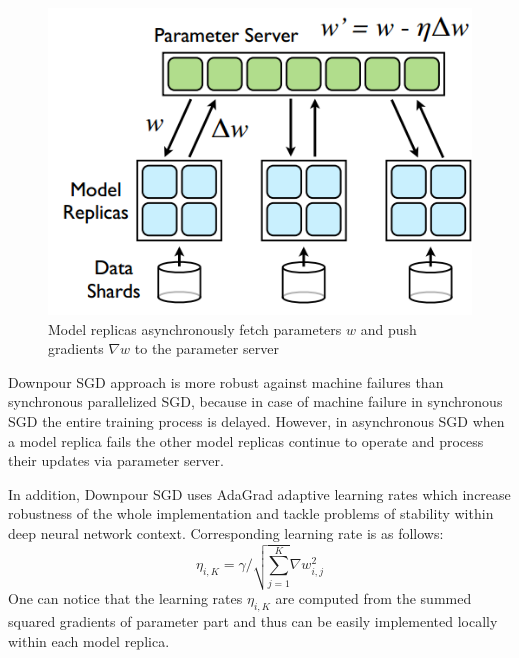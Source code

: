 \begin{figure}[h]
	\begin{center}
		\includegraphics[scale=0.4]{img/downpour-sgd-param.png}
		\caption{Model replicas asynchronously fetch parameters $w$ and push gradients $\nabla w$ to the parameter server}\label{5}
	\end{center}
\end{figure}

Downpour SGD approach is more robust against machine failures than synchronous parallelized SGD, because in case of machine failure in synchronous SGD the entire training process is delayed. However, in asynchronous SGD when a model replica fails the other model replicas continue to operate and process their updates via parameter server. 

In addition, Downpour SGD uses AdaGrad \cite{adagrad} adaptive learning rates which increase robustness of the whole implementation and tackle problems of stability within deep neural network context. Corresponding learning rate is as follows:
$$ \eta_{i,K}=\gamma / \sqrt{\sum\limits_{j=1}^{K}} \nabla w_{i,j}^2$$
One can notice that the learning rates $\eta_{i,K}$ are computed from the summed squared gradients of parameter part and thus can be easily implemented locally within each model replica.

